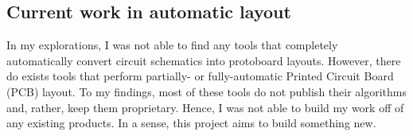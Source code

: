 \subsection{Current work in automatic layout}

In my explorations, I was not able to find any tools that completely
automatically convert circuit schematics into protoboard layouts. However, there
do exists tools that perform partially- or fully-automatic Printed Circuit
Board (PCB) layout. To my findings, most of these tools do not publish their
algorithms and, rather, keep them proprietary. Hence, I was not able to build my
work off of any existing products. In a sense, this project aims to build
something new.
